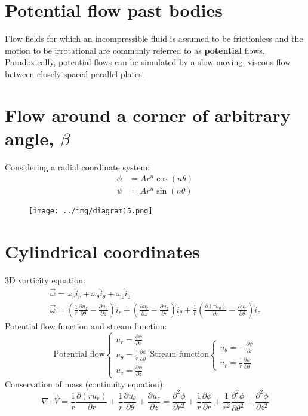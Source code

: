 \documentclass[class=report, crop=false, 12pt,a4paper]{standalone}
\begin{document}
\section{Potential flow past bodies}
Flow fields for which an incompressible fluid is assumed to be frictionless and the motion to be irrotational are commonly referred to as \textbf{potential} flows. Paradoxically, potential flows can be simulated by a slow moving, viscous flow between closely spaced parallel plates.
\section{Flow around a corner of arbitrary angle, $\beta$}
Considering a radial coordinate system:
\begin{align}
  \phi &= A r^n \cos(n\theta)\\
  \psi &= Ar^n \sin(n\theta)
\end{align}
\begin{figure}[H]
  \centering
  \texttt{[image: ../img/diagram15.png]}
\end{figure}
\section{Cylindrical coordinates}
3D vorticity equation:
\begin{gather}
  \vec{\omega} = \omega_r \hat{i}_r + \omega_{\theta} \hat{i}_{\theta} + \omega_z \hat{i}_z\\
  \vec{\omega} = \left(\frac{1}{r}\frac{\partial u_z}{\partial \theta} - \frac{\partial u_{\theta}}{\partial z}\right) \hat{i}_r + \left(\frac{\partial u_r}{\partial z} - \frac{\partial u_z}{\partial r}\right) \hat{i}_{\theta} + \frac{1}{r}\left(\frac{\partial (ru_{\theta})}{\partial r}-\frac{\partial u_r}{\partial \theta}\right)\hat{i}_z
\end{gather}
Potential flow function and stream function:
\begin{equation}
  \textrm{Potential flow}\begin{cases}
    u_r = \frac{\partial \phi}{\partial r}\\
    u_{\theta} = \frac{1}{r}\frac{\partial \phi}{\partial \theta}\\
    u_z = \frac{\partial \phi}{\partial z}
  \end{cases}
  \textrm{Stream function}\begin{cases}
    u_{\theta} = - \frac{\partial \psi}{\partial r}\\
    u_r = \frac{1}{r} \frac{\partial \psi}{\partial \theta}
  \end{cases}
\end{equation}
Conservation of mass (continuity equation):
\begin{equation}
  \nabla \cdot \vec{V} = \frac{1}{r} \frac{\partial (r u_r)}{\partial r} + \frac{1}{r} \frac{\partial u_{\theta}}{\partial \theta} + \frac{\partial u_z}{\partial z} = \frac{\partial^2 \phi}{\partial r^2} + \frac{1}{r}\frac{\partial \phi}{\partial r} +\frac{1}{r^2} \frac{\partial^2 \phi}{\partial \theta^2} + \frac{\partial^2 \phi}{\partial z^2}
\end{equation}
\end{document}
